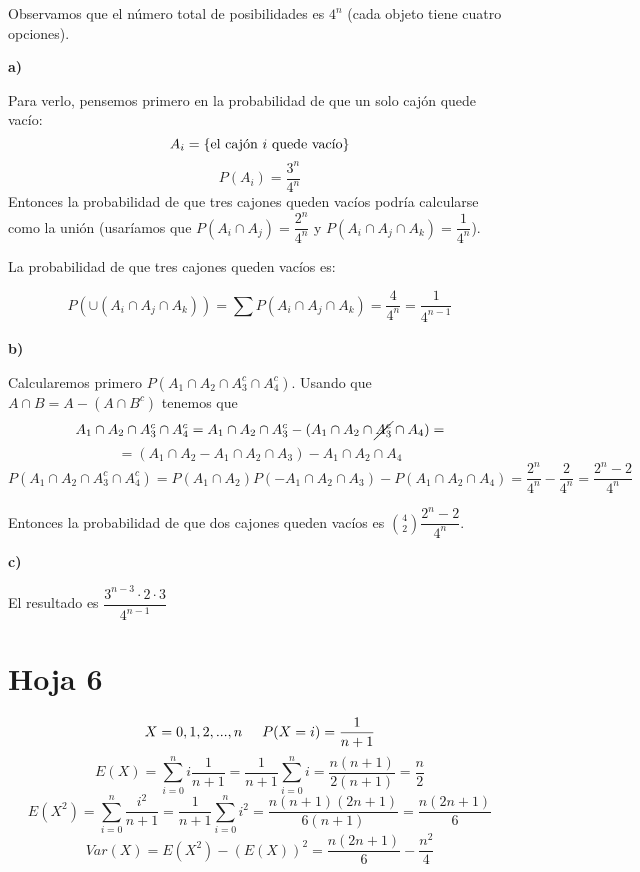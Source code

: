 \documentclass[openany]{book}
\begin{document}
\begin{exercise}
    $  $\\
    Observamos que el número total de posibilidades es $ 4 ^{n} $ (cada objeto tiene cuatro opciones).

    \textbf{a)}

    Para verlo, pensemos primero en la probabilidad de que un solo cajón quede vacío:
    $$ A_i = \{\text{el cajón $ i $ quede vacío}\} $$
    $$ P(A_i) = \dfrac{3^{n}}{4^{n}} $$
    Entonces la probabilidad de que tres cajones queden vacíos podría calcularse como la unión (usaríamos que $ P(A_i \cap A_j) = \dfrac{2^{n}}{4^{n}} $ y $ P(A_i \cap A_j \cap A_{k}) = \dfrac{1}{4^{n}} $).

    La probabilidad de que tres cajones queden vacíos es:

    $$ P(\cup (A_i \cap A_j \cap A_{k})) = \sum\limits_{}^{} P(A_i \cap A_j \cap A_{k}) = \dfrac{4}{4 ^{n}} = \dfrac{1}{4^{n-1}} $$

    \textbf{b)}

    Calcularemos primero $ P(A_1 \cap A_2 \cap A_3 ^{c} \cap A_4 ^{c}) $. Usando que $ A \cap B = A - (A \cap B ^{c}) $ tenemos que
    $$ A_1 \cap A_2 \cap A_3 ^{c} \cap A_4 ^{c} = A_1 \cap A_2 \cap A_3 ^{c} - (A_1 \cap A_2 \cap\cancel{  A_3 ^{c}} \cap A_4) = $$
    $$ = (A_1 \cap A_2 - A_1 \cap A_2 \cap A_3) - A_1 \cap A_2 \cap A_4 $$
    $$ P(A_1 \cap A_2 \cap A_3 ^{c} \cap A_4 ^{c}) = P(A_1 \cap A_2) P(- A_1 \cap A_2 \cap A_3) - P(A_1 \cap A_2 \cap A_4) = \dfrac{2^{n}}{4^{n}} -\dfrac{2}{4^{n}} = \dfrac{2^{n}-2}{4^{n}}  $$

    Entonces la probabilidad de que dos cajones queden vacíos es $ \binom{4}{2} \dfrac{2^{n}-2}{4^{n}} $.

    \textbf{c)}
    
    El resultado es $ \dfrac{3^{n-3}\cdot 2\cdot 3}{4^{n-1}} $

    

\end{exercise}

\chapter{Hoja 6}

\begin{exercise}
    $$ X= 0,1,2,...,n \hspace{5mm} P(X=i) = \dfrac{1}{n+1} $$
    $$ E(X) = \sum\limits_{i=0}^{n}i \dfrac{1}{n+1} = \dfrac{1}{n+1} \sum\limits_{i=0}^{n} i = \dfrac{n(n+1)}{2(n+1)} =  \dfrac{n}{2} $$
    $$ E(X^2) = \sum\limits_{i=0}^{n} \dfrac{i^2}{n+1} = \dfrac{1}{n+1} \sum\limits_{i=0}^{n}i^2 = \dfrac{n(n+1)(2n+1)}{6(n+1)} = \dfrac{n(2n+1)}{6}  $$
    $$ Var(X) = E(X^2) - (E(X))^2 = \dfrac{n(2n+1)}{6} - \dfrac{n^2}{4} $$


\end{exercise}
\end{document}
